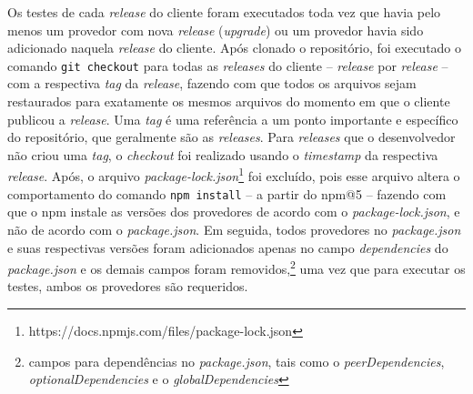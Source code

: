 Os testes de cada \textit{release} do cliente foram executados toda vez que havia pelo menos um provedor com nova \textit{release} (\textit{upgrade}) ou um provedor havia sido adicionado naquela \textit{release} do cliente. Após clonado o repositório, foi executado o comando \texttt{git checkout} para todas as \textit{releases} do cliente -- \textit{release} por \textit{release} -- com a respectiva \textit{tag} da \textit{release}, fazendo com que todos os arquivos sejam restaurados para exatamente os mesmos arquivos do momento em que o cliente publicou a \textit{release}. Uma \textit{tag} é uma referência a um ponto importante e específico do repositório, que geralmente são as \textit{releases}. Para \textit{releases} que o desenvolvedor não criou uma \textit{tag}, o \textit{checkout} foi realizado usando o \textit{timestamp} da respectiva \textit{release}. Após, o arquivo \textit{package-lock.json}\footnote{https://docs.npmjs.com/files/package-lock.json} foi excluído, pois esse arquivo altera o comportamento do comando \texttt{npm install} -- a partir do \textsf{npm@5} -- fazendo com que o \textsf{npm} instale as versões dos provedores de acordo com o \textit{package-lock.json}, e não de acordo com o \textit{package.json}. Em seguida, todos provedores no \textit{package.json} e suas respectivas versões foram adicionados apenas no campo \textit{dependencies} do \textit{package.json} e os demais campos foram removidos,\footnote{campos para dependências no \textit{package.json}, tais como o \textit{peerDependencies}, \textit{optionalDependencies} e o \textit{globalDependencies}} uma vez que para executar os testes, ambos os provedores são requeridos.

